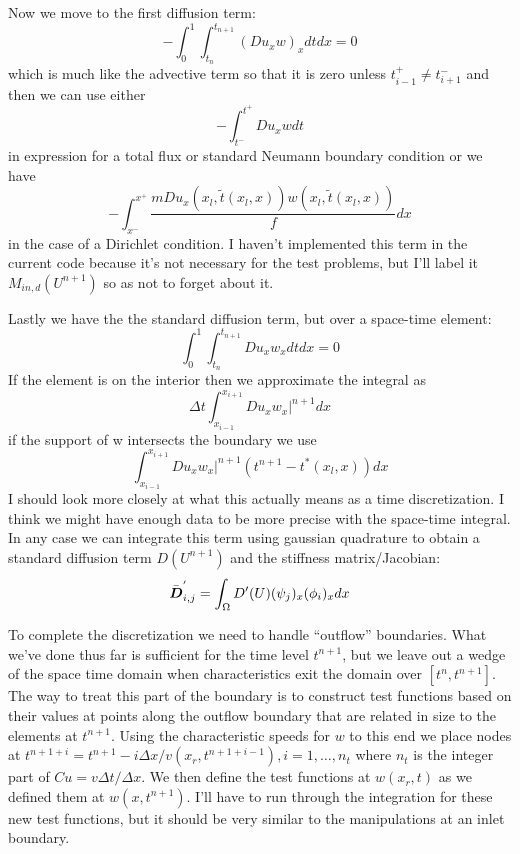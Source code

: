 \documentclass[10pt,dvips,twoside,reqno]{amsart}
\begin{document}
Now we move to the first diffusion term:
\begin{equation} 
-\int_0^1 \int_{t_n}^{t_{n+1}} (Du_x w)_x dt dx =0 
\end{equation} 
which is much like the advective term so that it is zero unless $t^{+}_{i-1} \neq t^{-}_{i+1}$ and then we can use either
\begin{equation}
-\int_{t^-}^{t^+} Du_x w dt
\end{equation}
in expression for a total flux or standard Neumann boundary condition or we have
\begin{equation}
-\int_{x^{-}}^{x^{+}} \frac{m D u_x(x_l,\tilde{t}(x_l,x)) w(x_l,\tilde{t}(x_l,x))}{f} dx
\end{equation}
in the case of a Dirichlet condition. I haven't implemented this term
in the current code because it's not necessary for the test problems,
but I'll label it $M_{in,d}(U^{n+1})$ so as not to forget about it.

Lastly we have the the standard diffusion term, but over a space-time element:
\begin{equation} 
\int_0^1 \int_{t_n}^{t_{n+1}} D u_x w_x  dt dx =0 
\end{equation}
If the element is on the interior then we approximate the integral as
\begin{equation}
\Delta t \int_{x_{i-1}}^{x_{i+1}} D u_x w_x |^{n+1} dx
\end{equation}
if the support of w intersects the boundary we use
\begin{equation}
\int_{x_{i-1}}^{x_{i+1}} D u_x w_x |^{n+1} (t^{n+1} - t^{*}(x_l,x))dx
\end{equation}
I should look more closely at what this actually means as a time
discretization. I think we might have enough data to be more precise
with the space-time integral. In any case we can integrate this term using gaussian quadrature to obtain a standard diffusion term $D(U^{n+1})$ and the stiffness matrix/Jacobian:
\begin{equation}
\bar{\mbox{{\boldmath ${D}$}}}^{'}_{i,j} = \int_{\Omega} D'(U) (\psi_j)_x (\phi_i)_x dx
\end{equation}

To complete the discretization we need to
handle ``outflow'' boundaries. What we've done thus far is sufficient
for the time level $t^{n+1}$, but we leave out a wedge of the space
time domain when characteristics exit the domain over $[t^n,t^{n+1}]$.
The way to treat this part of the boundary is to construct test
functions based on their values at points along the outflow boundary
that are related in size to the elements at $t^{n+1}$. Using the
characteristic speeds for $w$ to this end we place nodes at $t^{n+1+i}
= t^{n+1} - i \Delta x / v(x_r,t^{n+1+i-1}),i=1,\ldots,n_t$ where
$n_t$ is the integer part of $Cu=v \Delta t / \Delta x$. We then
define the test functions at $w(x_r,t)$ as we defined them at
$w(x,t^{n+1})$. I'll have to run through the integration for these new
test functions, but it should be very similar to the manipulations at
an inlet boundary.
\end{document}
